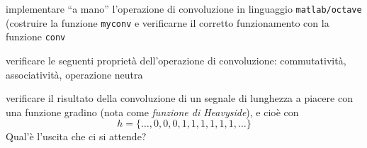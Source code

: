 \begin{compactenum}

  \item implementare ``a mano'' l'operazione di convoluzione in linguaggio {\tt matlab/octave} (costruire la funzione {\tt myconv}
        e verificarne il corretto funzionamento con la funzione {\tt conv}

  \item verificare le seguenti propriet\`a dell'operazione di convoluzione:
        commutativit\`a, associativit\`a, operazione neutra

  \item verificare il risultato della convoluzione di un segnale di lunghezza
        a piacere con una funzione gradino (nota come \emph{funzione di
        Heavyside}), e cio\`e con 
			  \begin{equation}	
				   h = \{ \ldots, 0, 0, 0, 1, 1, 1, 1, 1, 1, \ldots \}\nonumber
				\end{equation}
        Qual'\`e l'uscita che ci si attende?

\end{compactenum}

%
